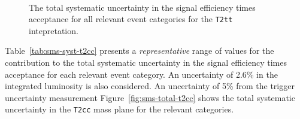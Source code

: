 \begin{figure}[h!]
  \begin{center}
    \\       
    \caption{\label{fig:sms-total-t2tt}The total systematic
      uncertainty in the signal efficiency times acceptance for all
      relevant event categories for the \texttt{T2tt} intepretation.}
  \end{center}
\end{figure}

Table~\ref{tab:sms-syst-t2cc} presents a {\it representative} range of
values for the contribution to the total systematic uncertainty in the
signal efficiency times acceptance for each relevant event
category. An uncertainty of 2.6\% in the integrated luminosity is also
considered. An uncertainty of 5\% from the trigger uncertainty measurement
Figure~\ref{fig:sms-total-t2cc} shows the total systematic uncertainty 
in the \verb!T2cc! mass plane for the relevant categories.


